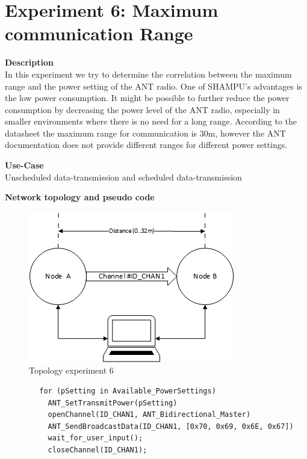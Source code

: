 \section{Experiment 6: Maximum communication Range}
\begin{description} 
	\item{\textbf{Description}} \hfill \\  In this experiment we try to determine the correlation between the maximum range and the power setting of the ANT radio. One of SHAMPU's advantages is the low power consumption. It might be possible to further reduce the power consumption by decreasing the power level of the ANT radio, especially in smaller environments where there is no need for a long range. According to the datasheet the maximum range for communication is 30m, however the ANT documentation does not provide different ranges for different power settings. 
	
	\item{\textbf{Use-Case}} \hfill \\ Unscheduled data-transmission and scheduled data-transmission	
	\item{\textbf{Network topology and pseudo code}} \hfill \\ 
	\begin{figure}[H]
		\centering
		\includegraphics[scale=1]{content/images/exp6_topo.png}
		\caption{Topology experiment 6}
	\end{figure}
	
	\begin{code}[H]
		\begin{verbatim}
		for (pSetting in Available_PowerSettings)
		  ANT_SetTransmitPower(pSetting)
		  openChannel(ID_CHAN1, ANT_Bidirectional_Master)
		  ANT_SendBroadcastData(ID_CHAN1, [0x70, 0x69, 0x6E, 0x67])
		  wait_for_user_input();
		  closeChannel(ID_CHAN1);
		\end{verbatim}
		\caption{Maximum communication range (Master)}\label{lst:mExp6}
	\end{code}
	

\end{description}
